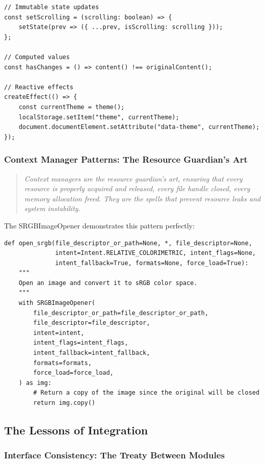 \documentclass[11pt]{article}
\begin{document}
\begin{lstlisting}[style=typescript]
// Immutable state updates
const setScrolling = (scrolling: boolean) => {
    setState(prev => ({ ...prev, isScrolling: scrolling }));
};

// Computed values
const hasChanges = () => content() !== originalContent();

// Reactive effects
createEffect(() => {
    const currentTheme = theme();
    localStorage.setItem("theme", currentTheme);
    document.documentElement.setAttribute("data-theme", currentTheme);
});
\end{lstlisting}

\subsubsection{Context Manager Patterns: The Resource Guardian's Art}

\begin{quote}
\emph{Context managers are the resource guardian's art, ensuring that every resource is properly acquired and released, every file handle closed, every memory allocation freed. They are the spells that prevent resource leaks and system instability.}
\end{quote}

The SRGBImageOpener demonstrates this pattern perfectly:

\begin{lstlisting}[style=python]
def open_srgb(file_descriptor_or_path=None, *, file_descriptor=None,
              intent=Intent.RELATIVE_COLORIMETRIC, intent_flags=None,
              intent_fallback=True, formats=None, force_load=True):
    """
    Open an image and convert it to sRGB color space.
    """
    with SRGBImageOpener(
        file_descriptor_or_path=file_descriptor_or_path,
        file_descriptor=file_descriptor,
        intent=intent,
        intent_flags=intent_flags,
        intent_fallback=intent_fallback,
        formats=formats,
        force_load=force_load,
    ) as img:
        # Return a copy of the image since the original will be closed
        return img.copy()
\end{lstlisting}

\subsection{The Lessons of Integration}

\subsubsection{Interface Consistency: The Treaty Between Modules}
\end{document}
